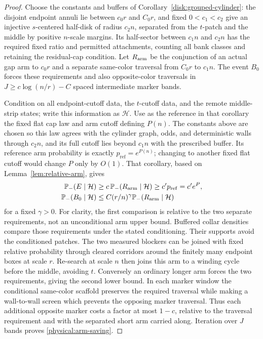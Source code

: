 \begin{proof}
Choose the constants and buffers of
Corollary~\ref{disk:grouped-cylinder}: the disjoint endpoint annuli lie
between \(c_0r\) and \(C_0r\), and fixed \(0<c_1<c_2\) give an injective
\(s\)-centered half-disk of radius \(c_2n\), separated from the
\(t\)-patch and the middle by positive \(n\)-scale margins.  Its
half-sector between \(c_1n\) and \(c_2n\) has the required fixed ratio
and permitted attachments, counting all bank classes and retaining the
residual-cap condition.  Let \(R_{\rm arm}\)
be the conjunction of an actual gap arm to \(c_0r\) and a separate
same-color traversal from \(C_0r\) to \(c_1n\). The event
\(B_0\) forces these requirements
and also opposite-color traversals in \(J\ge c\log(n/r)-C\)
spaced intermediate marker bands.

Condition on all endpoint-cutoff data, the \(t\)-cutoff data, and
the remote middle-strip states; write this information as
\(\mathcal H\).  Use as the reference in that corollary the fixed flat
cap law and arm cutoff defining \(P(n)\).  The constants above are chosen
so this law agrees with the cylinder graph, odds, and deterministic walls
through \(c_2n\), and its full cutoff lies beyond \(c_1n\) with the
prescribed buffer.  Its reference arm probability is exactly
\(p_{\mathrm{ref}}=e^{P(n)}\); changing to another fixed flat cutoff
would change \(P\) only by \(O(1)\).  That corollary, based on
Lemma~\ref{lem:relative-arm}, gives
\begin{align}
 \mathbb P_-(E\mid\mathcal H)
 &\ge c\,\mathbb P_-(R_{\rm arm}\mid\mathcal H)
 \ge c' p_{\mathrm{ref}}=c'e^P,\label{physical:arm-main}\\
 \mathbb P_-(B_0\mid\mathcal H)
 &\le C(r/n)^\gamma\mathbb P_-(R_{\rm arm}\mid\mathcal H)
 \label{physical:arm-saving}
\end{align}
for a fixed \(\gamma>0\).
For clarity, the first comparison is relative to the two separate
requirements, not an unconditional arm upper bound. Buffered collar
densities compare those requirements under the stated conditioning.
Their supports avoid the conditioned patches. The two measured
blockers can be joined with fixed relative probability through
cleared corridors around the finitely many endpoint boxes at scale
\(r\). Re-search at scale \(n\) then joins this arm to a winding
cycle before the middle, avoiding \(t\). Conversely an ordinary
longer arm forces the two requirements, giving the second lower
bound. In each marker window the conditional same-color scaffold
preserves the required traversal while making a wall-to-wall screen
which prevents the opposing marker traversal. Thus each additional
opposite marker costs a factor at most \(1-c\), relative to the
traversal requirement and with the separated short arm carried along.
Iteration over \(J\) bands proves \eqref{physical:arm-saving}.


\end{proof}

